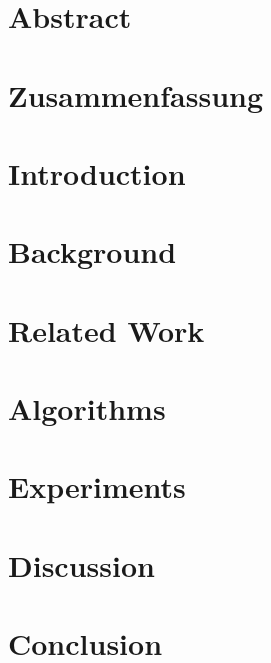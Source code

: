 \documentclass[12pt]{scrbook}
\begin{document}
\chapter*{Abstract}


\chapter*{Zusammenfassung}


\tableofcontents


\chapter{Introduction}


\chapter{Background}


\chapter{Related Work}


\chapter{Algorithms}


\chapter{Experiments}


\chapter{Discussion}


\chapter{Conclusion}


\printbibliography


\end{document}
